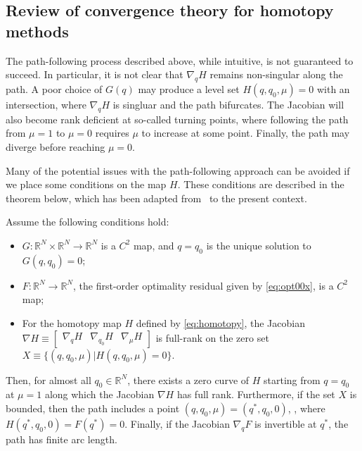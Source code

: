 \subsection{Review of convergence theory for homotopy methods}

The path-following process described above, while intuitive, is not guaranteed
to succeed.  In particular, it is not clear that $\nabla_q H$ remains
non-singular along the path.  A poor choice of $G(q)$ may produce a level set
$H(q,q_0,\mu) = 0$ with an intersection, where $\nabla_q H$ is singluar and the path
bifurcates.  The Jacobian will also become rank deficient at so-called turning
points, where following the path from $\mu=1$ to $\mu=0$ requires $\mu$ to
increase at some point.  Finally, the path may diverge before reaching
$\mu=0$.

Many of the potential issues with the path-following approach can be avoided if
we place some conditions on the map $H$.  These conditions are described in the
theorem below, which has been adapted from~\cite{watson_2002} to the present
context.

\begin{theorem}\label{thm:homotopy}
  Assume the following conditions hold:
  \begin{itemize}
  \item $G : \mathbb{R}^{N} \times \mathbb{R}^{N} \rightarrow \mathbb{R}^{N}$ is
    a $C^2$ map, and $q=q_0$ is the unique solution to $G(q,q_0) = 0$;    
  \item $F :\mathbb{R}^{N} \rightarrow \mathbb{R}^{N}$, the first-order
    optimality residual given by \eqref{eq:opt00x}, is a $C^2$ map;
  \item For the homotopy map $H$ defined by \eqref{eq:homotopy}, the Jacobian
    $\nabla H \equiv \begin{bmatrix} \nabla_q H & \nabla_{q_0} H & \nabla_\mu
    H \end{bmatrix}$ is full-rank on the zero set $X \equiv \{(q,q_0,\mu) |
    H(q,q_0,\mu) = 0 \}$.
  \end{itemize}
  Then, for almost all $q_0 \in \mathbb{R}^{N}$, there exists a zero curve of
  $H$ starting from $q=q_0$ at $\mu=1$ along which the Jacobian $\nabla H$ has
  full rank.  Furthermore, if the set $X$ is bounded, then the path includes a
  point $(q,q_0,\mu) = (q^*,q_0,0)$, \ie, where $H(q^{*},q_0,0) = F(q^{*}) = 0$.
  Finally, if the Jacobian $\nabla_q F$ is invertible at $q^{*}$, the path has
  finite arc length.
\end{theorem}

